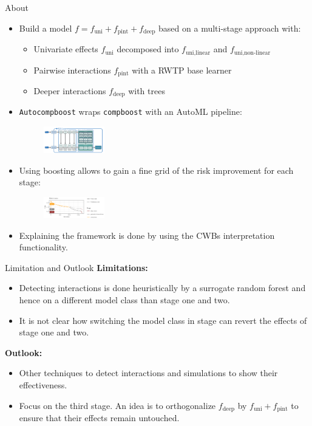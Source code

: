 \documentclass[t,10pt]{beamer}
\begin{document}
\begin{frame}{About}
  \begin{itemize}
    \item Build a model $f = f_{\text{uni}} + f_{\text{pint}} + f_{\text{deep}}$ based on a multi-stage approach with:
      \begin{itemize}
        \item Univariate effects $f_{\text{uni}}$ decomposed into $f_{\text{uni,linear}}$ and $f_{\text{uni,non-linear}}$
        \item Pairwise interactions $f_{\text{pint}}$ with a RWTP base learner
        \item Deeper interactions $f_{\text{deep}}$ with trees
      \end{itemize}
    \item \texttt{Autocompboost} wraps \texttt{compboost} with an AutoML pipeline:
      \begin{figure}
        \centering
        \includegraphics[width=0.25\textwidth]{figures/fig-acwb-ml-pipeline.png}
      \end{figure}
    \item Using boosting allows to gain a fine grid of the risk improvement for each stage:
      \begin{figure}
        \centering
        \includegraphics[width=0.25\textwidth]{figures/fig-acwb-risk.png}
      \end{figure}
    \item Explaining the framework is done by using the CWBs interpretation functionality.
  \end{itemize}
	\addtocounter{framenumber}{-1}
\end{frame}




\begin{frame}{Limitation and Outlook}
  \textbf{Limitations:}
  \begin{itemize}
    \item Detecting interactions is done heuristically by a surrogate random forest and hence on a different model class than stage one and two.
    \item It is not clear how switching the model class in stage can revert the effects of stage one and two.

  \end{itemize}
  \textbf{Outlook:}
  \begin{itemize}
    \item Other techniques to detect interactions and simulations to show their effectiveness.
    \item Focus on the third stage. An idea is to orthogonalize $f_{\text{deep}}$ by $f_{\text{uni}} + f_{\text{pint}}$ to ensure that their effects remain untouched.
  \end{itemize}
\end{frame}
\end{document}
